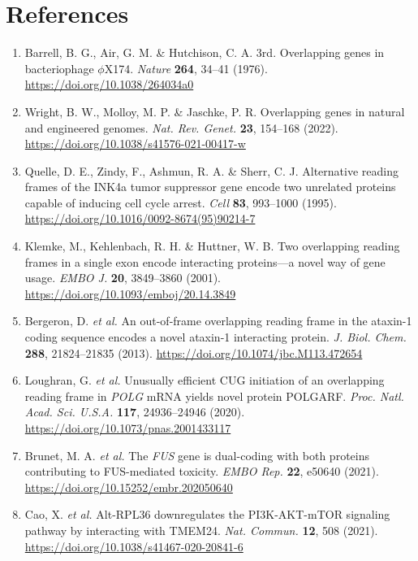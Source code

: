 \documentclass[10pt,letterpaper]{article}
\newcommand{\gene}[1]{\textit{#1}}
\begin{document}
\section*{References}
{\footnotesize\linespread{0.97}\selectfont\sloppy{}
\begin{enumerate}[leftmargin=1.9em,itemsep=-0.4pt,parsep=0pt,topsep=0.5pt]
  \item Barrell, B. G., Air, G. M. \& Hutchison, C. A. 3rd. Overlapping genes in bacteriophage $\phi$X174. \textit{Nature} \textbf{264}, 34--41 (1976). \url{https://doi.org/10.1038/264034a0}
  \item Wright, B. W., Molloy, M. P. \& Jaschke, P. R. Overlapping genes in natural and engineered genomes. \textit{Nat. Rev. Genet.} \textbf{23}, 154--168 (2022). \url{https://doi.org/10.1038/s41576-021-00417-w}
  \item Quelle, D. E., Zindy, F., Ashmun, R. A. \& Sherr, C. J. Alternative reading frames of the INK4a tumor suppressor gene encode two unrelated proteins capable of inducing cell cycle arrest. \textit{Cell} \textbf{83}, 993--1000 (1995). \url{https://doi.org/10.1016/0092-8674(95)90214-7}
  \item Klemke, M., Kehlenbach, R. H. \& Huttner, W. B. Two overlapping reading frames in a single exon encode interacting proteins---a novel way of gene usage. \textit{EMBO J.} \textbf{20}, 3849--3860 (2001). \url{https://doi.org/10.1093/emboj/20.14.3849}
  \item Bergeron, D. \textit{et al.} An out-of-frame overlapping reading frame in the ataxin-1 coding sequence encodes a novel ataxin-1 interacting protein. \textit{J. Biol. Chem.} \textbf{288}, 21824--21835 (2013). \url{https://doi.org/10.1074/jbc.M113.472654}
  \item Loughran, G. \textit{et al.} Unusually efficient CUG initiation of an overlapping reading frame in \gene{POLG} mRNA yields novel protein POLGARF. \textit{Proc. Natl. Acad. Sci. U.S.A.} \textbf{117}, 24936--24946 (2020). \url{https://doi.org/10.1073/pnas.2001433117}
  \item Brunet, M. A. \textit{et al.} The \gene{FUS} gene is dual-coding with both proteins contributing to FUS-mediated toxicity. \textit{EMBO Rep.} \textbf{22}, e50640 (2021). \url{https://doi.org/10.15252/embr.202050640}
  \item Cao, X. \textit{et al.} Alt-RPL36 downregulates the PI3K-AKT-mTOR signaling pathway by interacting with TMEM24. \textit{Nat. Commun.} \textbf{12}, 508 (2021). \url{https://doi.org/10.1038/s41467-020-20841-6}

\end{enumerate}}
\end{document}

